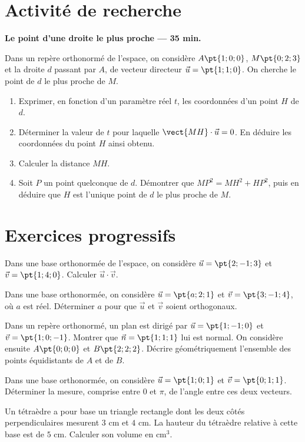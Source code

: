 \mxnewpage
\section{Activité de recherche}\textbf{Le point d'une droite le plus proche --- 35 min.}\par Dans un repère orthonormé de l'espace, on considère $A\pt{1;0;0}$, $M\pt{0;2;3}$ et la droite $d$ passant par $A$, de vecteur directeur $\vec u=\pt{1;1;0}$. On cherche le point de $d$ le plus proche de $M$.
\begin{enumerate}\item Exprimer, en fonction d'un paramètre réel $t$, les coordonnées d'un point $H$ de $d$.
\item Déterminer la valeur de $t$ pour laquelle $\vect{MH}\cdot\vec u=0$. En déduire les coordonnées du point $H$ ainsi obtenu.
\item Calculer la distance $MH$.
\item Soit $P$ un point quelconque de $d$. Démontrer que $MP^2=MH^2+HP^2$, puis en déduire que $H$ est l'unique point de $d$ le plus proche de $M$.\end{enumerate}

\mxnewpage
\section{Exercices progressifs}

Dans une base orthonormée de l'espace, on considère $\vec u=\pt{2;-1;3}$ et $\vec v=\pt{1;4;0}$. Calculer $\vec u\cdot\vec v$.

Dans une base orthonormée, on considère $\vec u=\pt{a;2;1}$ et $\vec v=\pt{3;-1;4}$, où $a$ est réel. Déterminer $a$ pour que $\vec u$ et $\vec v$ soient orthogonaux.

Dans un repère orthonormé, un plan est dirigé par $\vec u=\pt{1;-1;0}$ et $\vec v=\pt{1;0;-1}$. Montrer que $\vec n=\pt{1;1;1}$ lui est normal. On considère ensuite $A\pt{0;0;0}$ et $B\pt{2;2;2}$. Décrire géométriquement l'ensemble des points équidistants de $A$ et de $B$.

Dans une base orthonormée, on considère $\vec u=\pt{1;0;1}$ et $\vec v=\pt{0;1;1}$. Déterminer la mesure, comprise entre $0$ et $\pi$, de l'angle entre ces deux vecteurs.

Un tétraèdre a pour base un triangle rectangle dont les deux côtés perpendiculaires mesurent $3$ cm et $4$ cm. La hauteur du tétraèdre relative à cette base est de $5$ cm. Calculer son volume en $\mathrm{cm}^3$.

